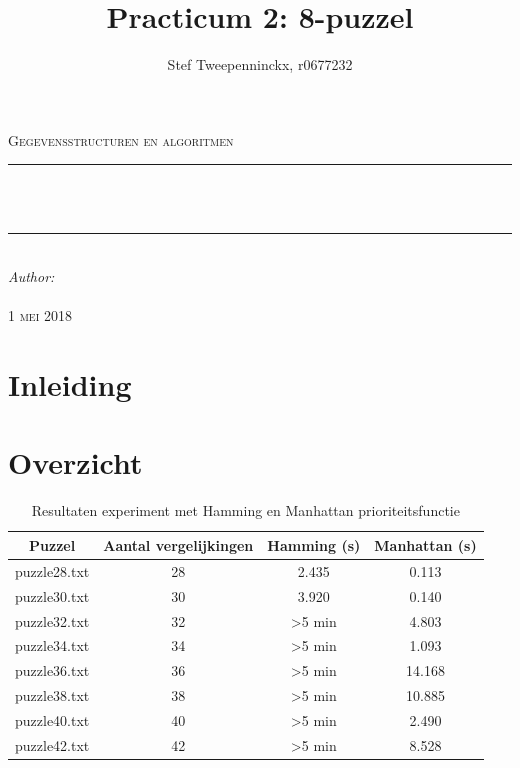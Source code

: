 \documentclass[11pt, a4paper]{article}
\author{Stef Tweepenninckx, r0677232}
\title{Practicum 2: 8-puzzel}
\makeatletter
\def\printtitle{                 
    {\large \@title}}
\def\printauthor{                  
    {\large \@author}}
\makeatother
\begin{document}
\begin{titlepage}
\newcommand{\HRule}{\rule{\linewidth}{0.5mm}} 
\center 
\textsc{\LARGE Gegevensstructuren en algoritmen}\\[1.5cm] 
\HRule \\[0.4cm]

{\huge \bfseries \printtitle}\\[0.4cm] 
\HRule \\[0.4cm]

\Large \emph{Author:}\\
 \textsc{\printauthor}\\[3cm]

{\large \textsc{1 mei 2018}}\\[3cm] 

\vfill 
\end{titlepage}

\section*{Inleiding}


\newpage
\section*{Overzicht}
\begin{table}[ht]
\centering
\label{my-label}
\begin{tabular}{|cccc|}
\hline
Puzzel       & Aantal vergelijkingen & Hamming (s)        & Manhattan (s) \\ \hline
puzzle28.txt & 28                    & 2.435              & 0.113         \\
puzzle30.txt & 30                    & 3.920              & 0.140         \\
puzzle32.txt & 32                    & \textgreater 5 min & 4.803         \\
puzzle34.txt & 34                    & \textgreater 5 min & 1.093         \\
puzzle36.txt & 36                    & \textgreater 5 min & 14.168        \\
puzzle38.txt & 38                    & \textgreater 5 min & 10.885        \\
puzzle40.txt & 40                    & \textgreater 5 min & 2.490         \\
puzzle42.txt & 42                    & \textgreater 5 min & 8.528         \\ \hline
\end{tabular}
\captionsetup{justification=centering,margin=2cm}
\caption{Resultaten experiment met Hamming en Manhattan prioriteitsfunctie}
\end{table}
\end{document}
